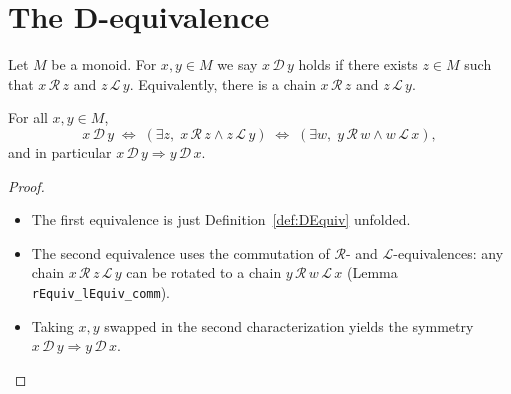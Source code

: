 \section{The D-equivalence}

\begin{definition}[D-equivalence]
\label{def:DEquiv}
Let \(M\) be a monoid. For \(x,y\in M\) we say \(x \,\mathcal D\, y\) holds if there exists \(z\in M\) such that
\(x \,\mathcal R\, z\) and \(z \,\mathcal L\, y\).
Equivalently, there is a chain \(x \,\mathcal R\, z\) and \(z \,\mathcal L\, y\).
\leanok
\end{definition}


\begin{lemma}
\label{lem:DEquiv-comm-symm}
For all \(x,y\in M\),
\[
 x \,\mathcal D\, y
\;\Longleftrightarrow\;
 (\exists z,\; x \,\mathcal R\, z \land z \,\mathcal L\, y)
\;\Longleftrightarrow\;
 (\exists w,\; y \,\mathcal R\, w \land w \,\mathcal L\, x),
\]
and in particular \(x \,\mathcal D\, y \Rightarrow y \,\mathcal D\, x\).
\leanok
{}
\end{lemma}
\begin{proof}
\leanok
\begin{itemize}
  \item The first equivalence is just Definition~\ref{def:DEquiv} unfolded.
  \item The second equivalence uses the commutation of \(\mathcal R\)- and \(\mathcal L\)-equivalences:
        any chain \(x \,\mathcal R\, z \,\mathcal L\, y\) can be rotated to a chain
        \(y \,\mathcal R\, w \,\mathcal L\, x\) (Lemma \texttt{rEquiv\_lEquiv\_comm}).
  \item Taking \(x,y\) swapped in the second characterization yields the symmetry
        \(x \,\mathcal D\, y \Rightarrow y \,\mathcal D\, x\).
\end{itemize}
\end{proof}


